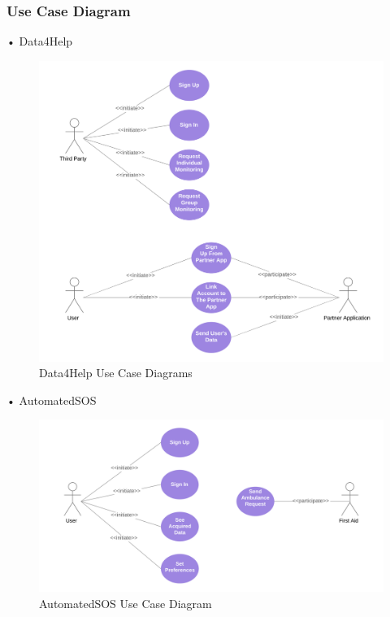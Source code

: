 \subsubsection{Use Case Diagram}
\begin{enumerate}
\begin{minipage}{\textwidth}
\FloatBarrier
\item[•]{\Large Data4Help}
\\[2cm]
\begin{figure}[H]
\centering
\includegraphics[scale=0.65]{Images/UseCaseDiagrams/Data4HelpUseCaseDiagram.png}
\caption{Data4Help Use Case Diagrams}
\end{figure}
\FloatBarrier
\end{minipage}
\clearpage


\begin{minipage}{\textwidth}
\item[•]{\Large AutomatedSOS}
\FloatBarrier
\begin{figure}[H]
\centering
\includegraphics[scale=0.65]{Images/UseCaseDiagrams/AutomatedSOSCaseDiagram.png}
\caption{AutomatedSOS Use Case Diagram}
\end{figure}
\FloatBarrier
\end{minipage}


\end{enumerate}
